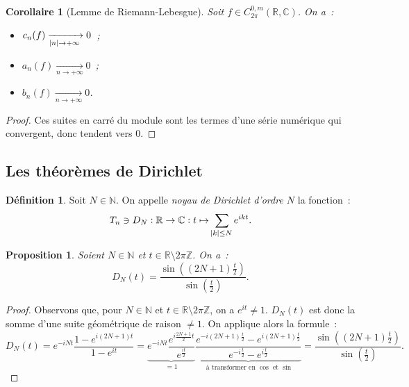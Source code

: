 \documentclass{report}
\newtheorem{prp}[thm]{Proposition}
\newtheorem{cor}[thm]{Corollaire}
\theoremstyle{definition}
\newtheorem{déf}[thm]{Définition}
\theoremstyle{remark}
\numberwithin{equation}{section}
\newcommand{\C}{\mathbb C}
\newcommand{\R}{\mathbb R}
\newcommand{\Z}{\mathbb Z}
\newcommand{\N}{\mathbb N}
\newcommand{\mconv}[3]{\xrightarrow[#1 \to #2]{#3}}
\newcommand{\pinfty}{{+\infty}}
\newcommand{\CmT}[2]{C^{#1,m}_{#2}}
\newcommand{\CzmT}[1]{\CmT 0{#1}}
\newcommand{\Czm}{\CzmT{2\pi}}
\begin{document}
			\begin{cor}[Lemme de Riemann-Lebesgue] Soit $f \in \Czm(\R, \C)$. On a~:
			\begin{itemize}
				\item $c_n(f) \mconv {\abs n}\pinfty{} 0$~;
				\item $a_n(f) \mconv n\pinfty{} 0$~;
				\item $b_n(f) \mconv n\pinfty{} 0$.
			\end{itemize}
			\end{cor}

			\begin{proof} Ces suites en carré du module sont les termes d'une série numérique qui convergent, donc tendent vers $0$.
			\end{proof}

		\subsection{Les théorèmes de Dirichlet}
			\begin{déf} Soit $N \in \N$. On appelle \textit{noyau de Dirichlet d'ordre $N$} la fonction~:
			\begin{equation}
				T_n \ni D_N : \R \to \C : t \mapsto \sum_{\abs k \leq N}e^{ikt}.
			\end{equation}
			\end{déf}

			\begin{prp}\label{prp:noyau de Dirichlet sin} Soient $N \in \N$ et $t \in \R \setminus 2\pi\Z$. On a~:
			\begin{equation}
				D_N(t) = \frac {\sin\left((2N+1)\frac t2\right)}{\sin\left(\frac t2\right)}.
			\end{equation}
			\end{prp}

			\begin{proof} Observons que, pour $N \in \N$ et $t \in \R \setminus 2\pi\Z$, on a $e^{it} \neq 1$. $D_N(t)$ est donc la somme d'une suite géométrique
			de raison $\neq 1$. On applique alors la formule~:
			\begin{equation}
				D_N(t) = e^{-iNt}\frac {1 - e^{i(2N+1)t}}{1 - e^{it}} =
					\underbrace {e^{-iNt}\frac {e^{i\frac {2N+1}2t}}{e^{\frac {it}2}}}_{=1}
					\underbrace {\frac {e^{-i(2N+1)\frac t2} - e^{i(2N+1)\frac t2}}{e^{-i\frac t2} - e^{i\frac t2}}}_{\text{ à transformer en $\cos$ et $\sin$}} = \frac {\sin\left((2N+1)\frac t2\right)}{\sin\left(\frac t2\right)}.
			\end{equation}
			\end{proof}
\end{document}
